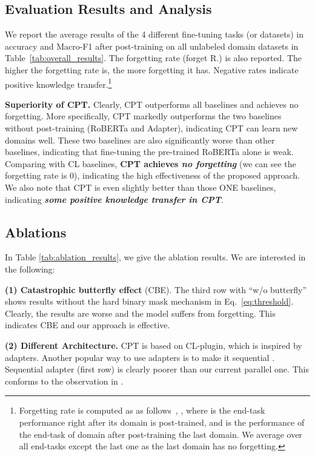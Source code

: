 \documentclass[11pt]{article}
\begin{document}
\subsection{Evaluation Results and Analysis}
\label{sec:results}
We report the average results of the 4 different fine-tuning tasks (or datasets) in accuracy and Macro-F1 after post-training on all unlabeled domain datasets in
Table~\ref{tab:overall_results}. The forgetting rate (forget R.) \cite{DBLP:conf/cvpr/LiuSLSS20} is also reported. The higher the forgetting rate is, the more forgetting it has. Negative rates indicate positive knowledge transfer.\footnote{Forgetting rate is {\color{black}computed as as follows~\cite{DBLP:conf/cvpr/LiuSLSS20},} , where  is the end-task performance right after its domain  is post-trained, and  is the performance of the end-task of domain  after post-training the last domain. We average over all end-tasks except the last one as the last domain has no forgetting.}


\textbf{Superiority of CPT.} Clearly, CPT outperforms all baselines and achieves no forgetting. More specifically, CPT markedly outperforms the two baselines without post-training (RoBERTa and Adapter), indicating CPT can learn new domains well. These two baselines are also  significantly worse than other baselines, indicating that fine-tuning the pre-trained RoBERTa alone is weak. 
Comparing with CL baselines, \textbf{CPT achieves \textit{no forgetting}} (we can see the forgetting rate is 0), indicating the high effectiveness of the proposed approach. We also note that CPT is even slightly better than those ONE baselines, indicating \textbf{\textit{some positive knowledge transfer in CPT}}. 


\subsection{Ablations} 
In Table \ref{tab:ablation_results}, we give the ablation results. We are interested in the following:

\textbf{(1) Catastrophic butterfly effect} (CBE). The third row with ``w/o butterfly'' shows results without the hard binary mask mechanism in Eq.~\ref{eq:threshold}. Clearly, the results are worse and the model suffers from forgetting. This indicates CBE and our approach is effective. 

\textbf{(2) Different Architecture.} CPT is based on CL-plugin, which is inspired by adapters. Another popular way to use adapters is to make it sequential \cite{Houlsby2019Parameter}. Sequential adapter (first row) is clearly poorer than our current parallel one. This conforms to the observation in \cite{DBLP:journals/corr/abs-2110-04366}. 
\end{document}
